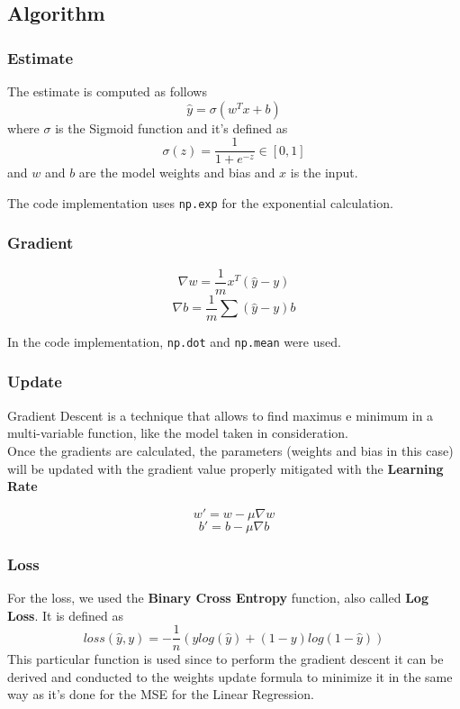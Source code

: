 \documentclass[
	letterpaper, %
	10pt, %
]{class}
\begin{document}
\subsection{Algorithm}

\subsubsection{Estimate}
The estimate is computed as follows
$$ \hat{y} = \sigma(w^Tx + b) $$
where $\sigma$ is the Sigmoid function \cite{sigmoid} and it's defined as
$$ \sigma(z) = \frac{1}{1 + e^{-z}} \in [0,1] $$
and $w$ and $b$ are the model weights and bias and $x$ is the input.

The code implementation uses \texttt{np.exp} for the exponential calculation.

\subsubsection{Gradient}

$$ \nabla w = \frac{1}{m}x^T(\hat{y} - y) $$
$$ \nabla b = \frac{1}{m}\sum(\hat{y} - y) b $$

In the code implementation, \texttt{np.dot} and \texttt{np.mean} were used.

\subsubsection{Update}

Gradient Descent \cite{sgd} is a technique that allows to find maximus e minimum in a multi-variable function, like the model taken in consideration.\\
Once the gradients are calculated, the parameters (weights and bias in this case) will be updated with the gradient value properly mitigated with the \textbf{Learning Rate}

$$ w' = w - \mu \nabla w $$
$$ b' = b - \mu \nabla b $$

\subsubsection{Loss}
For the loss, we used the \textbf{Binary Cross Entropy} \cite{binary_cross_entropy} function, also called \textbf{Log Loss}.
It is defined as
$$ loss(\hat{y}, y) = -\frac{1}{n}(y log(\hat{y}) + (1-y)log(1-\hat{y})) $$
This particular function is used since to perform the gradient descent it can be derived and conducted to the weights update formula to minimize it in the same way as it's done for the MSE \cite{mse} for the Linear Regression.\\
\end{document}
